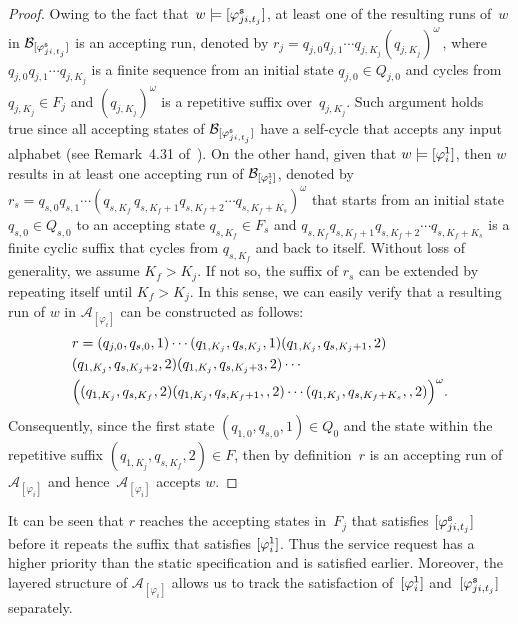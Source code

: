 \begin{proof}
Owing to the fact that~$w\models [\varphi_{ji,t_j}^{\textup{\texttt{s}}}]$, at least one of the resulting runs of~$w$ in  $\mathcal{B}_{[\varphi_{ji,t_j}^{\textup{\texttt{s}}}]}$ is an accepting run, denoted by $r_j=q_{j,0}q_{j,1}\cdots q_{j,K_j} (q_{j,K_j})^\omega\,$, where $q_{j,0}q_{j,1}\cdots q_{j,K_j}$ is a finite sequence from an initial state $q_{j,0}\in Q_{j,0}$ and cycles from~$q_{j,K_j}\in F_j$ and $(q_{j,K_j})^\omega$ is a repetitive suffix over~$q_{j,K_j}$. Such argument holds true since all accepting states of $\mathcal{B}_{[\varphi_{ji,t_j}^{\textup{\texttt{s}}}]}$ have a self-cycle that accepts any input alphabet (see Remark~4.31 of~\cite{baier2008principles}).
On the other hand, given that $w\models [\varphi_i^{\textup{\texttt{l}}}]$, then $w$ results in at least one accepting run of $\mathcal{B}_{[\varphi_i^{\textup{\texttt{l}}}]}$, denoted by $r_s=q_{s,0}q_{s,1}\cdots  (q_{s,K_f}\, q_{s,K_f+1}q_{s,K_f+2}\cdots q_{s,K_f+K_s})^\omega$  that starts from an initial state $q_{s,0}\in Q_{s,0}$ to an accepting state $q_{s,K_f}\in F_s$ and $q_{s,K_f}q_{s,K_f+1}q_{s,K_f+2}\cdots q_{s,K_f+K_s}$ is a finite cyclic suffix that cycles from $q_{s,K_f}$ and back to itself.
Without loss of generality, we assume $K_f>K_j$. If not so, the suffix of $r_s$ can be extended by repeating itself until $K_f>K_j$. In this sense, we can easily verify that a resulting run of $w$ in  ${\mathcal{A}}_{[\varphi_i]}$ can be constructed as follows:
\begin{equation}\label{ch03:eq:result-run}
\begin{aligned}
&r=(q_{j,0},q_{s,0},1)\cdots (q_{1,K_j},q_{s,K_j},1)(q_{1,K_j},q_{s,K_j+1},2)\\
&(q_{1,K_j},q_{s,K_j+2},2)(q_{1,K_j},q_{s,K_j+3},2)\cdots\\
&\Big{(}(q_{1,K_j},q_{s,K_f},2)(q_{1,K_j},q_{s,K_f+1},,2)\cdots (q_{1,K_j},q_{s,K_f+K_s},,2)\Big{)}^\omega.
\end{aligned}
\end{equation}
Consequently, since the first state $(q_{1,0},q_{s,0},1)\in Q_0$ and the state within the repetitive suffix $(q_{1,K_j},q_{s,K_f}, 2)\in F$, then by definition~$r$ is an accepting run of ${\mathcal{A}}_{[\varphi_i]}$ and hence~${\mathcal{A}}_{[\varphi_i]}$ accepts $w$.
\end{proof}

It can be  seen that $r$ reaches the accepting states in~$F_j$ that satisfies $[\varphi_{ji,t_j}^{\textup{\texttt{s}}}]$ before it repeats the suffix that satisfies $[\varphi_i^{\textup{\texttt{l}}}]$.
Thus the service request has a higher priority than the static specification and is satisfied earlier.
Moreover, the layered structure of ${\mathcal{A}}_{[\varphi_i]}$ allows us to track the satisfaction of~$[\varphi_i^{\textup{\texttt{l}}}]$ and~$[\varphi_{ji,t_j}^{\textup{\texttt{s}}}]$ separately.



